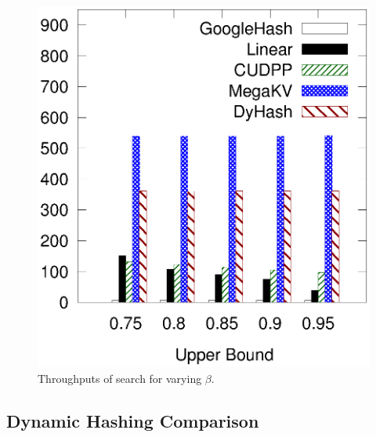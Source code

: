 \begin{figure}[t!]
\begin{minipage}{0.19\linewidth}
		\centerline{\dsali}
	\end{minipage}
	\hfill
	\begin{minipage}{0.19\linewidth}\centering
		\includegraphics[width=\linewidth]{pic/static-upper/upper_search_random.eps}
		\centerline{\dsrandom}
	\end{minipage}
	\caption{Throughputs of search for varying $\beta$.}
	\label{fig:static:all:search}
\end{figure}

\subsection{Dynamic Hashing Comparison}\label{sec:exp:dynamic}

